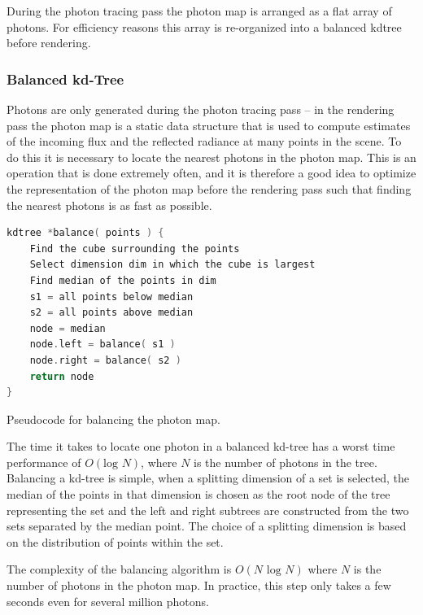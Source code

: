 During the photon tracing pass the photon map is arranged as a flat array of photons. For efficiency reasons this array is re-organized into a balanced kdtree before rendering.



\subsubsection{Balanced kd-Tree}
Photons are only generated during the photon tracing pass -- in the rendering pass the photon map is a static data structure that is used to compute estimates of the incoming flux and the reflected radiance at many points in the scene. To do this it is necessary to locate the nearest photons in the photon map. This is an operation that is done extremely often, and it is therefore a good idea to optimize the representation of the photon map before the rendering pass such that finding the nearest photons is as fast as possible.

\begin{algorithm}\label{al:balancing-photon-map}
\begin{lstlisting}[language=C++, mathescape]
kdtree *balance( points ) {
	Find the cube surrounding the points
	Select dimension dim in which the cube is largest 
	Find median of the points in dim
	s1 = all points below median
	s2 = all points above median
	node = median
	node.left = balance( s1 )
	node.right = balance( s2 )
	return node
}\end{lstlisting}
\caption{Pseudocode for balancing the photon map.}
\end{algorithm}

The time it takes to locate one photon in a balanced kd-tree\cite{a:MultidimensionalBinarySearchTreesUsedforAssociativeSearching} has a worst time performance of $O(\text{log }N )$, where $N$ is the number of photons in the tree. Balancing a kd-tree is simple, when a splitting dimension of a set is selected, the median of the points in that dimension is chosen as the root node of the tree representing the set and the left and right subtrees are constructed from the two sets separated by the median point. The choice of a splitting dimension is based on the distribution of points within the set.

The complexity of the balancing algorithm is $O(N\text{ log }N)$ where $N$ is the number of photons in the photon map. In practice, this step only takes a few seconds even for several million photons.



